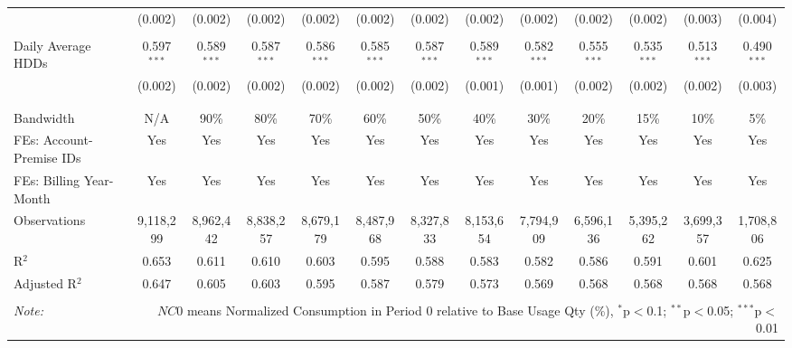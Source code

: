 \begin{table}[!htbp]
\begin{adjustbox}{scale = 0.8}
\begin{tabular}{@{\extracolsep{5pt}}lcccccccccccc}
  & (0.002) & (0.002) & (0.002) & (0.002) & (0.002) & (0.002) & (0.002) & (0.002) & (0.002) & (0.002) & (0.003) & (0.004) \\ 
  & & & & & & & & & & & & \\ 
 Daily Average HDDs & 0.597$^{***}$ & 0.589$^{***}$ & 0.587$^{***}$ & 0.586$^{***}$ & 0.585$^{***}$ & 0.587$^{***}$ & 0.589$^{***}$ & 0.582$^{***}$ & 0.555$^{***}$ & 0.535$^{***}$ & 0.513$^{***}$ & 0.490$^{***}$ \\ 
  & (0.002) & (0.002) & (0.002) & (0.002) & (0.002) & (0.002) & (0.001) & (0.001) & (0.002) & (0.002) & (0.002) & (0.003) \\ 
  & & & & & & & & & & & & \\ 
\hline \\[-1.8ex] 
Bandwidth & N/A & 90\% & 80\% & 70\% & 60\% & 50\% & 40\% & 30\% & 20\% & 15\% & 10\% & 5\% \\ 
FEs: Account-Premise IDs & Yes & Yes & Yes & Yes & Yes & Yes & Yes & Yes & Yes & Yes & Yes & Yes \\ 
FEs: Billing Year-Month & Yes & Yes & Yes & Yes & Yes & Yes & Yes & Yes & Yes & Yes & Yes & Yes \\ 
Observations & 9,118,299 & 8,962,442 & 8,838,257 & 8,679,179 & 8,487,968 & 8,327,833 & 8,153,654 & 7,794,909 & 6,596,136 & 5,395,262 & 3,699,357 & 1,708,806 \\ 
R$^{2}$ & 0.653 & 0.611 & 0.610 & 0.603 & 0.595 & 0.588 & 0.583 & 0.582 & 0.586 & 0.591 & 0.601 & 0.625 \\ 
Adjusted R$^{2}$ & 0.647 & 0.605 & 0.603 & 0.595 & 0.587 & 0.579 & 0.573 & 0.569 & 0.568 & 0.568 & 0.568 & 0.568 \\ 
\hline 
\hline \\[-1.8ex] 
\textit{Note:}  & \multicolumn{12}{r}{$NC0$ means Normalized Consumption in Period 0 relative to Base Usage Qty (\%), $^{*}$p$<$0.1; $^{**}$p$<$0.05; $^{***}$p$<$0.01} \\ 
\end{tabular}
\end{adjustbox} 
\end{table} 

